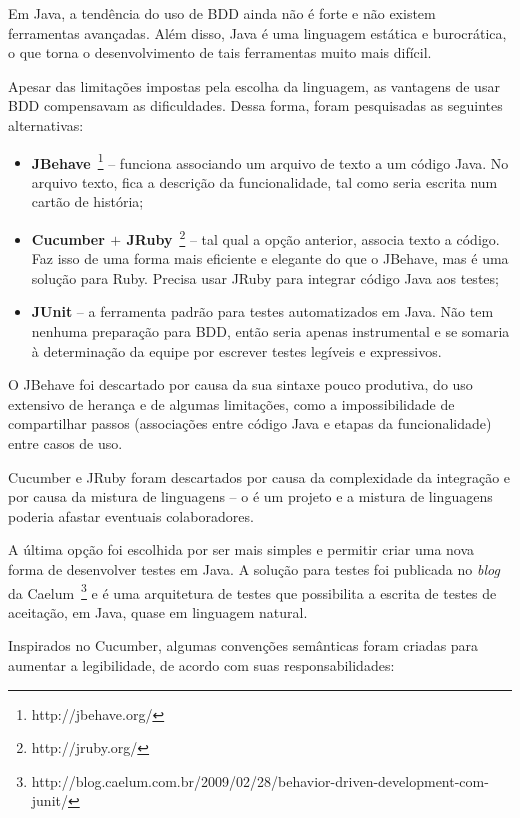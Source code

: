 Em Java, a tendência do uso de BDD ainda não é forte e não existem ferramentas avançadas. Além disso, Java é uma linguagem estática e burocrática, o que torna o desenvolvimento de tais ferramentas muito mais difícil. 

Apesar das limitações impostas pela escolha da linguagem, as vantagens de usar BDD compensavam as dificuldades. Dessa forma, foram pesquisadas as seguintes alternativas:

\begin{itemize}
	\item{\textbf{JBehave}~\footnote{http://jbehave.org/} -- funciona associando um arquivo de texto a um código Java. No arquivo texto, fica a descrição da funcionalidade, tal como seria escrita num cartão de história;}
	\item{\textbf{Cucumber $+$ JRuby}~\footnote{http://jruby.org/} -- tal qual a opção anterior, associa texto a código. Faz isso de uma forma mais eficiente e elegante do que o JBehave, mas é uma solução para Ruby. Precisa usar JRuby para integrar código Java aos testes;}
	\item{\textbf{JUnit} -- a ferramenta padrão para testes automatizados em Java. Não tem nenhuma preparação para BDD, então seria apenas instrumental e se somaria à determinação da equipe por escrever testes legíveis e expressivos.}
\end{itemize}

O JBehave foi descartado por causa da sua sintaxe pouco produtiva, do uso extensivo de herança e de algumas limitações, como a impossibilidade de compartilhar passos (associações entre código Java e etapas da funcionalidade) entre casos de uso.

Cucumber e JRuby foram descartados por causa da complexidade da integração e por causa da mistura de linguagens -- o \calopsita{} é um projeto \opensource{} e a mistura de linguagens poderia afastar eventuais colaboradores.

A última opção foi escolhida por ser mais simples e permitir criar uma nova forma de desenvolver testes em Java. A solução para testes foi publicada no \textit{blog} da Caelum~\footnote{http://blog.caelum.com.br/2009/02/28/behavior-driven-development-com-junit/} e é uma arquitetura de testes que possibilita a escrita de testes de aceitação, em Java, quase em linguagem natural. 

Inspirados no Cucumber, algumas convenções semânticas foram criadas para aumentar a legibilidade, de acordo com suas responsabilidades:

